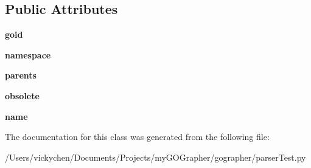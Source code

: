 \subsection*{Public Attributes}
\begin{DoxyCompactItemize}
\item 
\hypertarget{classparser_test_1_1_g_o_node_a0bf4142425670d0f07e39e5e8c8fa0b3}{
{\bfseries goid}}
\label{classparser_test_1_1_g_o_node_a0bf4142425670d0f07e39e5e8c8fa0b3}

\item 
\hypertarget{classparser_test_1_1_g_o_node_a4a2b10c58ae2ba39e803bb947c36894e}{
{\bfseries namespace}}
\label{classparser_test_1_1_g_o_node_a4a2b10c58ae2ba39e803bb947c36894e}

\item 
\hypertarget{classparser_test_1_1_g_o_node_ad6aeb446c627b2cbadcfcd87d1eeed2d}{
{\bfseries parents}}
\label{classparser_test_1_1_g_o_node_ad6aeb446c627b2cbadcfcd87d1eeed2d}

\item 
\hypertarget{classparser_test_1_1_g_o_node_a74e59b8bc01fea95819ba6c2f37ea20f}{
{\bfseries obsolete}}
\label{classparser_test_1_1_g_o_node_a74e59b8bc01fea95819ba6c2f37ea20f}

\item 
\hypertarget{classparser_test_1_1_g_o_node_a3fe236bd4b6747ea5422d62ba85ff7f1}{
{\bfseries name}}
\label{classparser_test_1_1_g_o_node_a3fe236bd4b6747ea5422d62ba85ff7f1}

\end{DoxyCompactItemize}


The documentation for this class was generated from the following file:\begin{DoxyCompactItemize}
\item 
/Users/vickychen/Documents/Projects/myGOGrapher/gographer/parserTest.py\end{DoxyCompactItemize}
